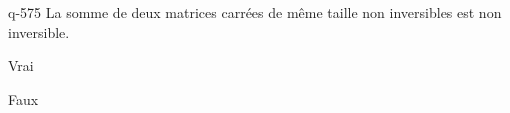 \begin{truefalse}{q-575}
La somme de deux matrices carrées de même taille non inversibles est non inversible.
\item Vrai
\item* Faux
\end{truefalse}


